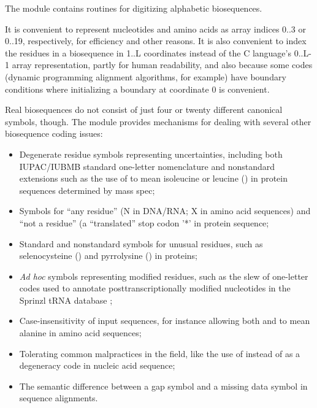 The  module contains routines for digitizing
alphabetic biosequences.

It is convenient to represent nucleotides and amino acids as array
indices 0..3 or 0..19, respectively, for efficiency and other
reasons. It is also convenient to index the residues in a biosequence
in 1..L coordinates instead of the C language's 0..L-1 array
representation, partly for human readability, and also because some
codes (dynamic programming alignment algorithms, for example) have
boundary conditions where initializing a boundary at coordinate 0 is
convenient.

Real biosequences do not consist of just four or twenty different
canonical symbols, though. The  module provides
mechanisms for dealing with several other biosequence coding issues:

\begin{itemize}
  \item Degenerate residue symbols representing uncertainties,
        including both IUPAC/IUBMB standard one-letter nomenclature
        and nonstandard extensions such as the use of  to
        mean isoleucine or leucine () in protein sequences
        determined by mass spec;

  \item Symbols for ``any residue'' (N in DNA/RNA; X in amino acid
    sequences) and ``not a residue'' (a ``translated'' stop codon '*'
    in protein sequence;

  \item Standard and nonstandard symbols for unusual residues, such as
        selenocysteine () and pyrrolysine () in
        proteins;

  \item \emph{Ad hoc} symbols representing modified residues, such as
        the slew of one-letter codes used to annotate
        posttranscriptionally modified nucleotides in the Sprinzl tRNA
        database \citep{Sprinzl98};

  \item Case-insensitivity of input sequences, for instance allowing
        both  and  to mean alanine in amino acid
        sequences;

  \item Tolerating common malpractices in the field, like the use of
        instead of  as a degeneracy code in nucleic
       acid sequence;

  \item The semantic difference between a gap symbol and a missing
        data symbol in sequence alignments.
\end{itemize}        

